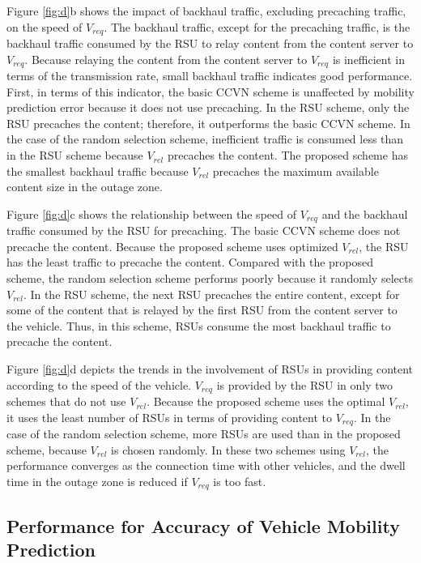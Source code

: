 \documentclass[electronics,aricle,accept,pdftex,moreauthors]{Definitions/mdpi}
\begin{document}
Figure \ref{fig:d}b shows the impact of backhaul traffic, excluding precaching traffic, on the speed of ${V}_{req}$. The backhaul traffic, except for the precaching traffic, is the backhaul traffic consumed by the RSU to relay content from the content server to ${V}_{req}$. Because relaying the content from the content server to ${V}_{req}$ is inefficient in terms of the transmission rate, small backhaul traffic indicates good performance. First, in terms of this indicator, the basic CCVN scheme is unaffected by mobility prediction error because it does not use precaching. In the RSU scheme, only the RSU precaches the content; therefore, it outperforms the basic CCVN scheme. In the case of the random selection scheme, inefficient traffic is consumed less than in the RSU scheme because ${V}_{rel}$ precaches the content. The proposed scheme has the smallest backhaul traffic because ${V}_{rel}$ precaches the maximum available content size in the outage zone.

Figure \ref{fig:d}c shows the relationship between the speed of ${V}_{req}$ and the backhaul traffic consumed by the RSU for precaching. The basic CCVN scheme does not precache the content. Because the proposed scheme uses optimized ${V}_{rel}$, the RSU has the least traffic to precache the content. Compared with the proposed scheme, the random selection scheme performs poorly because it randomly selects ${V}_{rel}$. In the RSU scheme, the next RSU precaches the entire content, except for some of the content that is relayed by the first RSU from the content server to the vehicle. Thus, in this scheme, RSUs consume the most backhaul traffic to precache the content.

Figure \ref{fig:d}d depicts the trends in the involvement of RSUs in providing content according to the speed of the vehicle. ${V}_{req}$ is provided by the RSU in only two schemes that do not use ${V}_{rel}$. Because the proposed scheme uses the optimal ${V}_{rel}$, it uses the least number of RSUs in terms of providing content to ${V}_{req}$. In the case of the random selection scheme, more RSUs are used than in the proposed scheme, because ${V}_{rel}$ is chosen randomly. In these two schemes using ${V}_{rel}$, the performance converges as the connection time with other vehicles, and the dwell time in the outage zone is reduced if ${V}_{req}$ is too fast.

\subsection{Performance for Accuracy of Vehicle Mobility Prediction} \label{sec.5.4}
\end{document}
